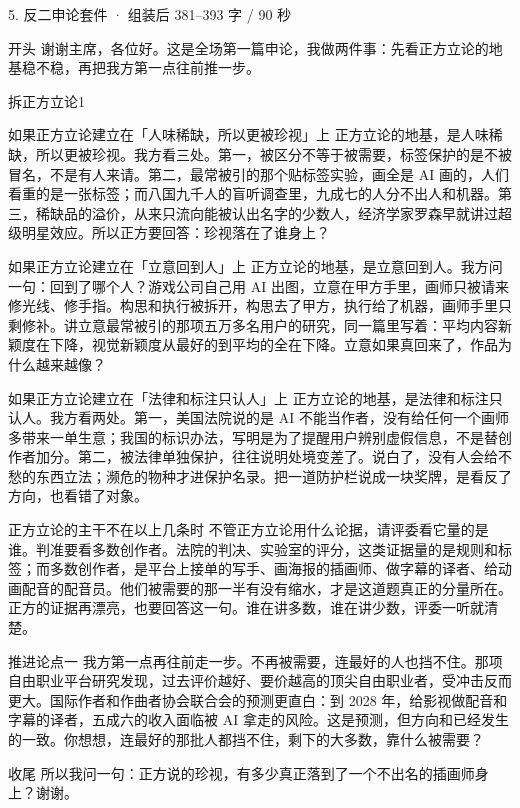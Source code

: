 \documentclass[script,con]{debate}
\begin{document}
\begin{kit}{5. 反二申论}{套件 · 组装后 381–393 字 / 90 秒}
\begin{fixed}{开头}
谢谢主席，各位好。这是全场第一篇申论，我做两件事：先看正方立论的地基稳不稳，再把我方第一点往前推一步。
\end{fixed}
\begin{pick}{拆正方立论}{1}
\begin{module}{如果正方立论建立在「人味稀缺，所以更被珍视」上}
正方立论的地基，是人味稀缺，所以更被珍视。我方看三处。第一，被区分不等于被需要，标签保护的是不被冒名，不是有人来请。第二，最常被引的那个贴标签实验，画全是 AI 画的，人们看重的是一张标签；而八国九千人的盲听调查里，九成七的人分不出人和机器。第三，稀缺品的溢价，从来只流向能被认出名字的少数人，经济学家罗森早就讲过超级明星效应。所以正方要回答：珍视落在了谁身上？
\end{module}
\begin{module}{如果正方立论建立在「立意回到人」上}
正方立论的地基，是立意回到人。我方问一句：回到了哪个人？游戏公司自己用 AI 出图，立意在甲方手里，画师只被请来修光线、修手指。构思和执行被拆开，构思去了甲方，执行给了机器，画师手里只剩修补。讲立意最常被引的那项五万多名用户的研究，同一篇里写着：平均内容新颖度在下降，视觉新颖度从最好的到平均的全在下降。立意如果真回来了，作品为什么越来越像？
\end{module}
\begin{module}{如果正方立论建立在「法律和标注只认人」上}
正方立论的地基，是法律和标注只认人。我方看两处。第一，美国法院说的是 AI 不能当作者，没有给任何一个画师多带来一单生意；我国的标识办法，写明是为了提醒用户辨别虚假信息，不是替创作者加分。第二，被法律单独保护，往往说明处境变差了。说白了，没有人会给不愁的东西立法；濒危的物种才进保护名录。把一道防护栏说成一块奖牌，是看反了方向，也看错了对象。
\end{module}
\begin{fallback}{正方立论的主干不在以上几条时}
不管正方立论用什么论据，请评委看它量的是谁。判准要看多数创作者。法院的判决、实验室的评分，这类证据量的是规则和标签；而多数创作者，是平台上接单的写手、画海报的插画师、做字幕的译者、给动画配音的配音员。他们被需要的那一半有没有缩水，才是这道题真正的分量所在。正方的证据再漂亮，也要回答这一句。谁在讲多数，谁在讲少数，评委一听就清楚。
\end{fallback}
\end{pick}
\begin{fixed}{推进论点一}
我方第一点再往前走一步。不再被需要，连最好的人也挡不住。那项自由职业平台研究发现，过去评价越好、要价越高的顶尖自由职业者，受冲击反而更大。国际作者和作曲者协会联合会的预测更直白：到 2028 年，给影视做配音和字幕的译者，五成六的收入面临被 AI 拿走的风险。这是预测，但方向和已经发生的一致。你想想，连最好的那批人都挡不住，剩下的大多数，靠什么被需要？
\end{fixed}
\begin{fixed}{收尾}
所以我问一句：正方说的珍视，有多少真正落到了一个不出名的插画师身上？谢谢。
\end{fixed}
\end{kit}
\end{document}
